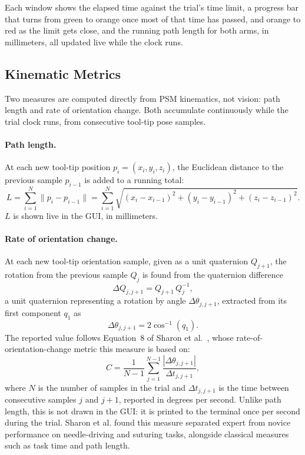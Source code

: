 Each window shows the elapsed time against the trial's time limit, a
progress bar that turns from green to orange once most of that time
has passed, and orange to red as the limit gets close, and the
running path length for both arms, in millimeters, all updated live
while the clock runs.

\subsection{Kinematic Metrics}
\label{subsec:kinematic_metrics}

Two measures are computed directly from PSM kinematics, not vision:
path length and rate of orientation change. Both accumulate
continuously while the trial clock runs, from consecutive tool-tip
pose samples.

\paragraph{Path length.} At each new tool-tip position
$p_i = (x_i, y_i, z_i)$, the Euclidean distance to the previous sample
$p_{i-1}$ is added to a running total:
\begin{equation}
L = \sum_{i=1}^{N} \lVert p_i - p_{i-1} \rVert
  = \sum_{i=1}^{N} \sqrt{(x_i - x_{i-1})^2 + (y_i - y_{i-1})^2 + (z_i - z_{i-1})^2}.
\end{equation}
$L$ is shown live in the GUI, in millimeters.

\paragraph{Rate of orientation change.} At each new tool-tip
orientation sample, given as a unit quaternion $Q_{j+1}$, the rotation
from the previous sample $Q_j$ is found from the quaternion difference
\begin{equation}
\Delta Q_{j,j+1} = Q_{j+1} \, Q_j^{-1},
\end{equation}
a unit quaternion representing a rotation by angle
$\Delta\theta_{j,j+1}$, extracted from its first component $q_1$ as
\begin{equation}
\Delta\theta_{j,j+1} = 2 \cos^{-1}(q_1).
\end{equation}
The reported value follows Equation~8 of Sharon et
al.~\cite{sharon2021}, whose rate-of-orientation-change metric this
measure is based on:
\begin{equation}
C = \frac{1}{N-1}\sum_{j=1}^{N-1} \frac{|\Delta\theta_{j,j+1}|}{\Delta t_{j,j+1}},
\end{equation}
where $N$ is the number of samples in the trial and $\Delta
t_{j,j+1}$ is the time between consecutive samples $j$ and $j+1$,
reported in degrees per second. Unlike path length, this is not drawn
in the GUI: it is printed to the terminal once per second during the
trial. Sharon et al. found this measure separated expert from novice
performance on needle-driving and suturing tasks, alongside classical
measures such as task time and path length.

